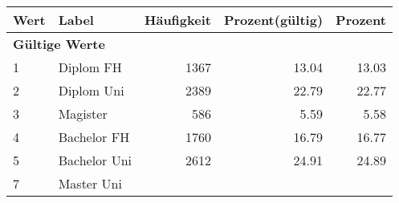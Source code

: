      \begin{longtable}{lXrrr}
     \toprule
     \textbf{Wert} & \textbf{Label} & \textbf{Häufigkeit} & \textbf{Prozent(gültig)} & \textbf{Prozent} \\
     \endhead
     \midrule
     \multicolumn{5}{l}{\textbf{Gültige Werte}}\\

     1 &
     \multicolumn{1}{X}{ Diplom FH   } &


       \num{1367} &
       \num[round-mode=places,round-precision=2]{13.04} &
         \num[round-mode=places,round-precision=2]{13.03} \\

     2 &
     \multicolumn{1}{X}{ Diplom Uni   } &


       \num{2389} &
       \num[round-mode=places,round-precision=2]{22.79} &
         \num[round-mode=places,round-precision=2]{22.77} \\

     3 &
     \multicolumn{1}{X}{ Magister   } &


       \num{586} &
       \num[round-mode=places,round-precision=2]{5.59} &
         \num[round-mode=places,round-precision=2]{5.58} \\

     4 &
     \multicolumn{1}{X}{ Bachelor FH   } &


       \num{1760} &
       \num[round-mode=places,round-precision=2]{16.79} &
         \num[round-mode=places,round-precision=2]{16.77} \\

     5 &
     \multicolumn{1}{X}{ Bachelor Uni   } &


       \num{2612} &
       \num[round-mode=places,round-precision=2]{24.91} &
         \num[round-mode=places,round-precision=2]{24.89} \\

     7 &
     \multicolumn{1}{X}{ Master Uni   } &



\end{longtable}
